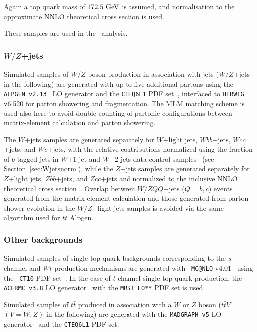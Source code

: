 
Again a top quark mass of $172.5\gev$ is assumed, and normalisation to the
approximate NNLO theoretical cross section is used.

These samples are used in the \htx\ analysis.


\subsubsection{$W/Z$+jets}

Simulated samples of $W/Z$ boson production in association with jets
($W/Z$+jets in the following) are generated with up to five additional 
partons using the {\tt ALPGEN v2.13}~\cite{ALPGEN} LO generator and the 
{\tt CTEQ6L1} PDF set~\cite{cteq6}, interfaced to {\tt HERWIG} v6.520 
for parton showering and fragmentation.
The MLM matching scheme is used also here to avoid double-counting of partonic configurations 
between  matrix-element  calculation and parton showering.

The $W$+jets samples are generated separately for $W$+light jets, 
$Wb\bar{b}$+jets, $Wc\bar{c}$+jets, and $Wc$+jets, 
with the relative contributions normalized using the fraction 
of $b$-tagged jets in $W$+1-jet and $W$+2-jets data 
control samples~\cite{whf} (see Section~\ref{sec:Wjetsnorm}), while
the $Z$+jets samples are generated separately 
for $Z$+light jets, $Zb\bar{b}$+jets, and $Zc\bar{c}$+jets and
normalized to the inclusive NNLO theoretical cross section~\cite{vjetsxs}.
Overlap between $W/ZQ\bar{Q}$+jets ($Q=b,c$) 
events generated from the matrix element calculation and those
generated from parton-shower evolution in the $W/Z$+light jets
samples is avoided via the same algorithm used
for $t\bar{t}$ Alpgen.

\subsubsection{Other backgrounds}\label{subsec:otherbkg}
Simulated samples of single top quark backgrounds corresponding to the
$s$-channel and $Wt$ production mechanisms are generated with {\tt
MC@NLO} v4.01~\cite{mcatnlo_1,mcatnlo_2,mcatnlo_3} using the {\tt
CT10} PDF set~\cite{ct10}.  In the case of $t$-channel single top
quark production, the {\tt ACERMC v3.8} LO generator~\cite{acermc}
with the {\tt MRST LO**} PDF set is used.

Simulated samples of $t\bar{t}$ produced in association with a $W$ or $Z$ boson
($t\bar{t}V$ $(V=W,Z)$ in the following) are generated with the {\tt MADGRAPH v5} LO
generator~\cite{madgraph} and the {\tt CTEQ6L1} PDF set.  

